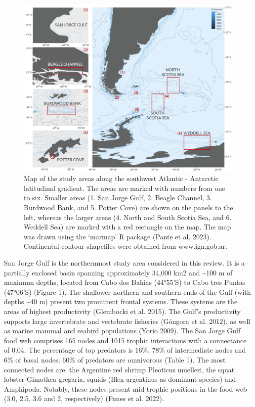 \documentclass[
]{article}
\begin{document}
\begin{figure}
\centering
\includegraphics[width=6.27in,height=3.528in]{Figures/Map_final.jpg}
\caption{Map of the study areas along the southwest Atlantic - Antarctic
latitudinal gradient. The areas are marked with numbers from one to six.
Smaller areas (1. San Jorge Gulf, 2. Beagle Channel, 3. Burdwood Bank,
and 5. Potter Cove) are shown on the panels to the left, whereas the
larger areas (4. North and South Scotia Sea, and 6. Weddell Sea) are
marked with a red rectangle on the map. The map was drawn using the
`marmap' R package (Pante et al. 2023). Continental contour shapefiles
were obtained from www.ign.gob.ar.}
\end{figure}

San Jorge Gulf is the northernmost study area considered in this review.
It is a partially enclosed basin spanning approximately 34,000 km2 and
\textasciitilde100 m of maximum depths, located from Cabo dos Bahias
(44°55'S) to Cabo tres Puntas (47°06'S) (Figure 1). The shallower
northern and southern ends of the Gulf (with depths \textasciitilde40 m)
present two prominent frontal systems. These systems are the areas of
highest productivity (Glembocki et al. 2015). The Gulf's productivity
supports large invertebrate and vertebrate fisheries (Góngora et al.
2012), as well as marine mammal and seabird populations (Yorio 2009).
The San Jorge Gulf food web comprises 165 nodes and 1015 trophic
interactions with a connectance of 0.04. The percentage of top predators
is 16\%, 78\% of intermediate nodes and 6\% of basal nodes; 60\% of
predators are omnivorous (Table 1). The most connected nodes are: the
Argentine red shrimp Pleoticus muelleri, the squat lobster Gimothea
gregaria, squids (Illex argentinus as dominant species) and Amphipoda.
Notably, these nodes present mid-trophic positions in the food web (3.0,
2.5, 3.6 and 2, respectively) (Funes et al. 2022).
\end{document}
